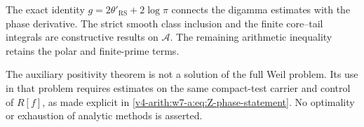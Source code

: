 The exact identity \(g=2\theta'_{\mathrm{RS}}+2\log\pi\) connects
the digamma estimates with the phase derivative. The strict smooth
class inclusion and the finite core--tail integrals are constructive
results on \(\mathscr A\). The remaining arithmetic inequality
retains the polar and finite-prime terms.

\begin{remark}
\label{v4-arith:w7-a:rem:closing-beilinson}
The auxiliary positivity theorem is not a solution of the full
Weil problem. Its use in that problem requires estimates on the
same compact-test carrier and control of \(R[f]\), as made explicit
in \eqref{v4-arith:w7-a:eq:Z-phase-statement}. No optimality or
exhaustion of analytic methods is asserted.
\end{remark}
